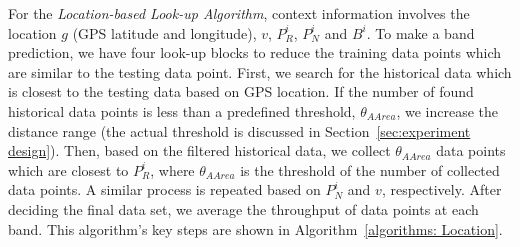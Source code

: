 For the {\it Location-based Look-up Algorithm}, 
context information involves the location $g$ (GPS latitude and longitude), $v$, $P_R^i$, $P_N^i$ 
and $B^i$. To make a band prediction, we have four look-up blocks to reduce
the training data points which are similar to the testing data point. First,
we search for the historical data which is closest to the testing data based on GPS location.
If the number of found historical data points is less than a predefined threshold, 
 $\theta_{AArea}$, we increase the distance range (the actual threshold is discussed in 
Section~\ref{sec:experiment design}). Then, based on the filtered historical data,
we collect $\theta_{AArea}$ data points which are closest to $P_R^i$, where $\theta_{AArea}$ is the threshold of the number of collected data points. 
A similar process is repeated based on $P_N^i$ and $v$, respectively.
After deciding the final data set, we average the throughput of data points at each band.
This algorithm's key steps are shown in Algorithm~\ref{algorithms: Location}.


